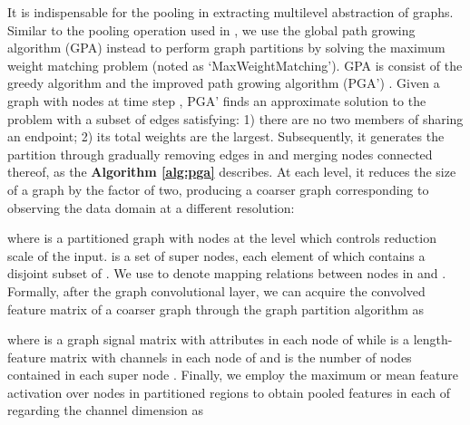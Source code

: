 \documentclass[sigconf,screen]{acmart}
\begin{document}
It is indispensable for the pooling in extracting multilevel abstraction of graphs. Similar to the pooling operation used in \cite{defferrard2016convolutional}, we use the global path growing algorithm (GPA) \cite{maue2007engineering} instead to perform graph partitions by solving the maximum weight matching problem (noted as `MaxWeightMatching'). GPA is consist of the greedy algorithm and the improved path growing algorithm (PGA') \cite{drake2003linear}. Given a graph  with  nodes at time step , PGA' finds an approximate solution to the problem with a subset of edges  satisfying: 1) there are no two members of  sharing an endpoint; 2) its total weights are the largest. Subsequently, it generates the partition through gradually removing edges in  and merging nodes connected thereof, as the \textbf{Algorithm \ref{alg:pga}} describes. At each level, it reduces the size of a graph by the factor of two, producing a coarser graph corresponding to observing the data domain at a different resolution:

where  is a partitioned graph with  nodes at the level  which controls reduction scale of the input.  is a set of super nodes, each element  of which contains a disjoint subset of . We use  to denote mapping relations between nodes in  and . Formally, after the graph convolutional layer, we can acquire the convolved feature matrix of a coarser graph  through the graph partition algorithm as

where  is a graph signal matrix with  attributes in each node of  while  is a length- feature matrix with  channels in each node of  and  is the number of nodes contained in each super node . Finally, we employ the maximum or mean feature activation over  nodes in partitioned regions to obtain pooled features in each  of  regarding the channel dimension as
\end{document}

